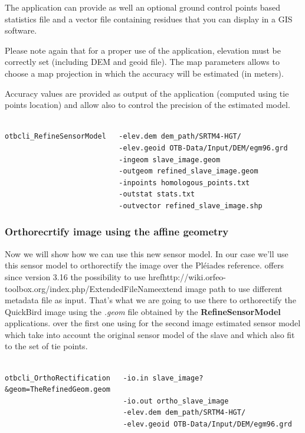 The application can provide as well an optional ground control points based
statistics file and a vector file containing residues that you can display in a
GIS software.

Please note again that for a proper use of the application, elevation must be
correctly set (including DEM and geoid file). The map parameters allows to
choose a map projection in which the accuracy will be estimated (in meters).

Accuracy values are provided as output of the application (computed using tie
points location) and allow also to control the precision of the estimated model.

\begin{verbatim}

otbcli_RefineSensorModel   -elev.dem dem_path/SRTM4-HGT/
                           -elev.geoid OTB-Data/Input/DEM/egm96.grd
                           -ingeom slave_image.geom
                           -outgeom refined_slave_image.geom
                           -inpoints homologous_points.txt
                           -outstat stats.txt
                           -outvector refined_slave_image.shp

\end{verbatim}

\subsubsection{Orthorecrtify image using the affine geometry}

Now we will show how we can use this new sensor model. In our case we'll use
this sensor model to orthorectify the image over the Pléiades reference. \otb
offers since version 3.16 the possibility to use
href{http://wiki.orfeo-toolbox.org/index.php/ExtendedFileName}{extend image}
path to use different metadata file as input. That's what we are going to use
there to orthorectify the QuickBird image using the \textit{.geom} file obtained
by the \textbf{RefineSensorModel} applications.  over the first one using for
the second image estimated sensor model which take into account the original
sensor model of the slave and which also fit to the set of tie points.

\begin{verbatim}

otbcli_OrthoRectification   -io.in slave_image?&geom=TheRefinedGeom.geom
                            -io.out ortho_slave_image
                            -elev.dem dem_path/SRTM4-HGT/
                            -elev.geoid OTB-Data/Input/DEM/egm96.grd
                     
\end{verbatim}

